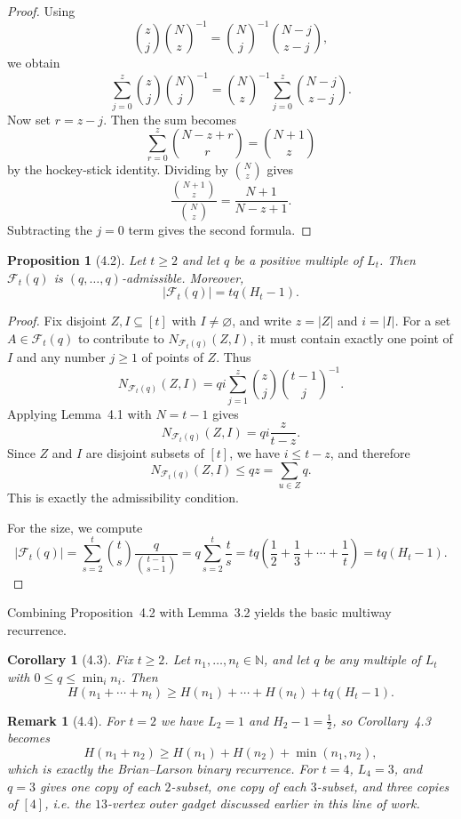 \documentclass[11pt]{article}
\newtheorem{proposition}[theorem]{Proposition}
\newtheorem{corollary}[theorem]{Corollary}
\newtheorem{remark}[theorem]{Remark}
\begin{document}
\begin{proof}
Using
\[
\binom{z}{j} \binom{N}{z}^{-1} = \binom{N}{j}^{-1} \binom{N-j}{z-j},
\]
we obtain
\[
\sum_{j=0}^z \binom{z}{j} \binom{N}{j}^{-1} = \binom{N}{z}^{-1} \sum_{j=0}^z \binom{N-j}{z-j}.
\]
Now set $r = z-j$. Then the sum becomes
\[
\sum_{r=0}^z \binom{N-z+r}{r} = \binom{N+1}{z}
\]
by the hockey-stick identity. Dividing by $\binom{N}{z}$ gives
\[
\frac{\binom{N+1}{z}}{\binom{N}{z}} = \frac{N+1}{N-z+1}.
\]
Subtracting the $j=0$ term gives the second formula.
\end{proof}

\begin{proposition}[4.2]
Let $t \ge 2$ and let $q$ be a positive multiple of $L_t$. Then $\mathcal F_t(q)$ is $(q,\dots,q)$-admissible. Moreover,
\[
|\mathcal F_t(q)| = tq(H_t - 1).
\]
\end{proposition}

\begin{proof}
Fix disjoint $Z,I \subseteq [t]$ with $I \neq \varnothing$, and write $z = |Z|$ and $i = |I|$. For a set $A \in \mathcal F_t(q)$ to contribute to $N_{\mathcal F_t(q)}(Z,I)$, it must contain exactly one point of $I$ and any number $j \ge 1$ of points of $Z$. Thus
\[
N_{\mathcal F_t(q)}(Z,I) = q i \sum_{j=1}^z \binom{z}{j} \binom{t-1}{j}^{-1}.
\]
Applying Lemma~4.1 with $N=t-1$ gives
\[
N_{\mathcal F_t(q)}(Z,I) = q i \frac{z}{t-z}.
\]
Since $Z$ and $I$ are disjoint subsets of $[t]$, we have $i \le t-z$, and therefore
\[
N_{\mathcal F_t(q)}(Z,I) \le qz = \sum_{u \in Z} q.
\]
This is exactly the admissibility condition.

For the size, we compute
\[
|\mathcal F_t(q)| = \sum_{s=2}^t \binom{t}{s} \frac{q}{\binom{t-1}{s-1}} = q \sum_{s=2}^t \frac{t}{s} = tq\left(\frac12 + \frac13 + \cdots + \frac1t\right) = tq(H_t - 1).
\]
\end{proof}

Combining Proposition~4.2 with Lemma~3.2 yields the basic multiway recurrence.

\begin{corollary}[4.3]
Fix $t \ge 2$. Let $n_1,\dots,n_t \in \mathbb N$, and let $q$ be any multiple of $L_t$ with $0 \le q \le \min_i n_i$. Then
\[
H(n_1 + \cdots + n_t) \ge H(n_1) + \cdots + H(n_t) + tq(H_t - 1).
\]
\end{corollary}

\begin{remark}[4.4]
For $t=2$ we have $L_2=1$ and $H_2-1=\frac12$, so Corollary~4.3 becomes
\[
H(n_1+n_2) \ge H(n_1) + H(n_2) + \min(n_1,n_2),
\]
which is exactly the Brian--Larson binary recurrence. For $t=4$, $L_4=3$, and $q=3$ gives one copy of each $2$-subset, one copy of each $3$-subset, and three copies of $[4]$, i.e. the $13$-vertex outer gadget discussed earlier in this line of work.
\end{remark}
\end{document}
